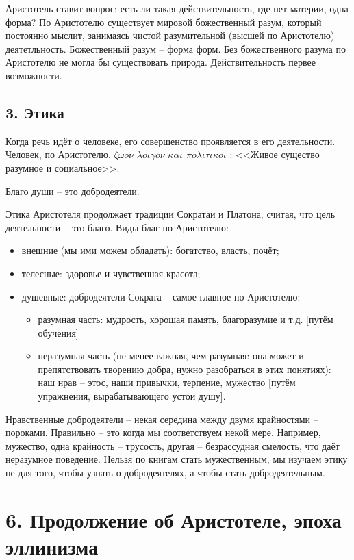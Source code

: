 \documentclass[a4paper, 12pt]{book} %
\begin{document}
Аристотель ставит вопрос: есть ли такая действительность, где нет материи, одна форма? По Аристотелю существует мировой божественный разум, который постоянно мыслит, занимаясь чистой разумительной (высшей по Аристотелю) деятетльность. Божественный разум -- форма форм. Без божественного разума по Аристотелю не могла бы существовать природа. Действительность первее возможности.

\subsection*{3. Этика}

Когда речь идёт о человеке, его совершенство проявляется в его деятельности. Человек, по Аристотелю, $\zeta \omega o \nu$ $\lambda o \iota \gamma o \nu$ $\kappa  \alpha \iota$ $\pi o \lambda \iota \tau \iota \kappa o \iota $ : <<Живое существо разумное и социальное>>. 

Благо души -- это добродеятели.

Этика Аристотеля продолжает традиции Сократаи и Платона, считая, что цель деятельности -- это благо. Виды благ по Аристотелю:
\begin{itemize}
\item внешние (мы ими можем обладать): богатство, власть, почёт;
\item телесные: здоровье и чувственная красота;
\item душевные: добродеятели Сократа -- самое главное по Аристотелю:
\begin{itemize}
\item разумная часть: мудрость, хорошая память, благоразумие и т.д. [путём обучения]
\item неразумная часть (не менее важная, чем разумная: она может и препятствовать творению добра, нужно разобраться в этих понятиях): наш нрав -- этос, наши привычки, терпение, мужество [путём упражнения, вырабатывающего устои душу].
\end{itemize}
\end{itemize}
Нравственные добродеятели -- некая середина между двумя крайностями -- пороками. Правильно -- это когда мы соответствуем некой мере. Например, мужество, одна крайность -- трусость, другая -- безрассудная смелость, что даёт неразумное поведение. Нельзя по книгам стать мужественным, мы изучаем этику не для того, чтобы узнать о добродеятелях, а чтобы стать добродеятельным.


\section*{6. Продолжение об Аристотеле, эпоха эллинизма}
\end{document}
